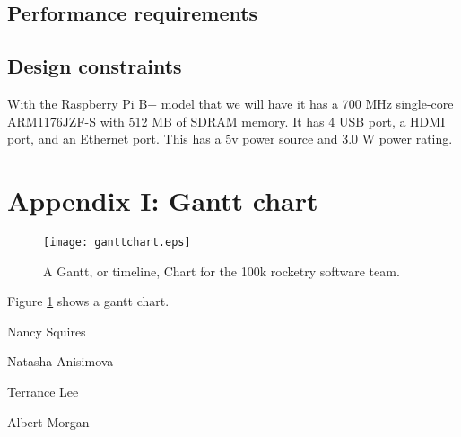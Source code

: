 \documentclass[10pt,journal,draftclsnofoot,onecolumn]{IEEEtran}
\begin{document}
	\subsection{Performance requirements}
	\subsection{Design constraints}
	With the Raspberry Pi B+ model that we will have it has a 700 MHz single-core ARM1176JZF-S with 512 MB of SDRAM memory.  It has 4 USB port, a HDMI port, and an Ethernet port.  This has a 5v power source and 3.0 W power rating.

	
	
\section{Appendix I: Gantt chart}

\begin{figure}
  \texttt{[image: ganttchart.eps]}
  \caption{A Gantt, or timeline, Chart for the 100k rocketry software team.}
  \label{fig:gantt}
\end{figure}

Figure \ref{fig:gantt} shows a gantt chart.

\begin{minipage}{\textwidth}
	
	\vspace{1in}
	\noindent Nancy Squires

	\vspace{1in}
	\noindent Natasha Anisimova

	\vspace{1in}
	\noindent Terrance Lee

	\vspace{1in}
	\noindent Albert Morgan\\

\end{minipage}
\end{document}
